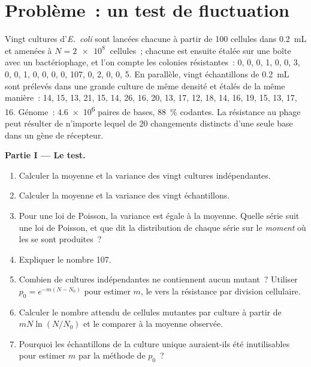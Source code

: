 \section{Problème~: un test de fluctuation}

\begin{problem}
\label{pb:b2:genome-diversification:1}
Vingt cultures d'\emph{E.~coli} sont lancées chacune à partir de
\num{100} cellules dans \qty{0.2}{mL} et amenées à $N = \qty{2e8}{}$
cellules~; chacune est ensuite étalée sur une boîte avec un
bactériophage, et l'on compte les colonies résistantes~: 0, 0, 0, 1, 0,
0, 3, 0, 0, 1, 0, 0, 0, 0, 107, 0, 2, 0, 0, 5. En parallèle, vingt
échantillons de \qty{0.2}{mL} sont prélevés dans une grande culture de
même densité et étalés de la même manière~: 14, 15, 13, 21, 15, 14,
26, 16, 20, 13, 17, 12, 18, 14, 16, 19, 15, 13, 17, 16. Génome~:
\qty{4.6e6}{} paires de bases, \qty{88}{\%} codantes. La résistance au
phage peut résulter de n'importe lequel de \num{20} changements
distincts d'une seule base dans un gène de récepteur.

\medskip
\noindent\textbf{Partie I --- Le test.}
\begin{enumerate}
  \item Calculer la moyenne et la variance des vingt cultures
        indépendantes.
  \item Calculer la moyenne et la variance des vingt échantillons.
  \item Pour une loi de Poisson, la variance est égale à la moyenne.
        Quelle série suit une loi de Poisson, et que dit la distribution
        de chaque série sur le \emph{moment} où les  se sont
        produites~?
  \item Expliquer le nombre 107.
  \item Combien de cultures indépendantes ne contiennent aucun mutant~?
        Utiliser $p_0 = e^{-m(N - N_0)}$ pour estimer $m$, le  vers la résistance par division cellulaire.
  \item Calculer le nombre attendu de cellules mutantes par culture à
        partir de $mN\ln(N/N_0)$ et le comparer à la moyenne observée.
  \item Pourquoi les échantillons de la culture unique auraient-ils été
        inutilisables pour estimer $m$ par la méthode de $p_0$~?
\end{enumerate}


\end{problem}
